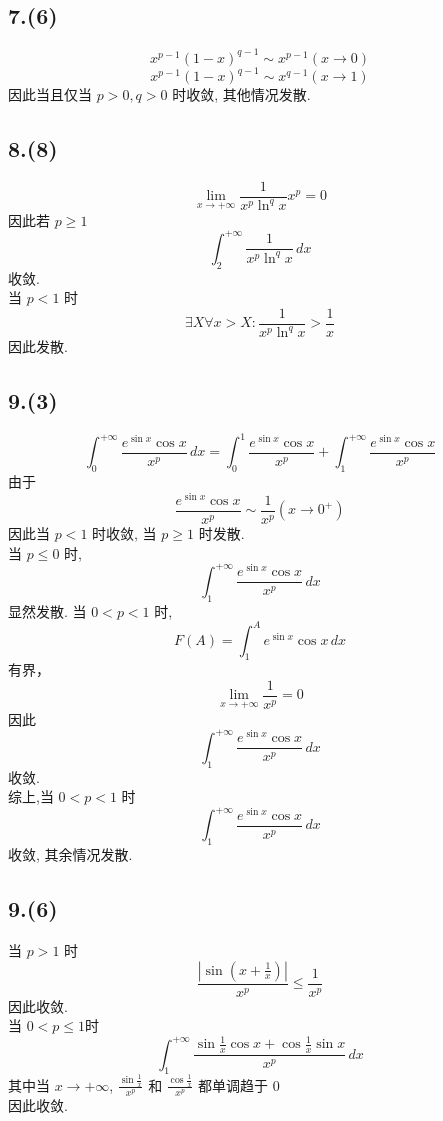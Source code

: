 \documentclass[12pt, a4paper, oneside]{ctexart}
\begin{document}
        \subsection*{7.(6)}
            $$
                x^{p-1}(1-x)^{q-1}\sim x^{p-1} (x\to 0)
            $$
            $$
                x^{p-1}(1-x)^{q-1}\sim x^{q-1} (x\to 1)
            $$
            因此当且仅当 $p>0,q>0$ 时收敛, 其他情况发散.
        \subsection*{8.(8)}
            $$
                \lim_{x\to +\infty}\frac{1}{x^p\ln^qx}x^p=0
            $$
            因此若 $p \geq 1$
            $$
                \int^{+\infty}_{2}\frac{1}{x^p\ln^q x}\,dx
            $$
            收敛.\\
            当 $p < 1$ 时
            $$
                \exists X \forall x > X:\frac{1}{x^p\ln^qx}> \frac1x
            $$
            因此发散.
        \subsection*{9.(3)}
            $$
                \int_{0}^{+\infty}\frac{e^{\sin x}\cos x}{x^p}\,dx=\int_{0}^{1}\frac{e^{\sin x}\cos x}{x^p}+\int_{1}^{+\infty}\frac{e^{\sin x}\cos x}{x^p}
            $$
            由于
            $$
                \frac{e^{\sin x}\cos x}{x^p}\sim \frac{1}{x^p}(x\to 0^+)
            $$
            因此当 $p<1$ 时收敛, 当 $p\geq 1$ 时发散.\\
            当 $p\leq 0$ 时,
            $$
                \int_{1}^{+\infty}\frac{e^{\sin x}\cos x}{x^p}\,dx
            $$
            显然发散.
            当 $0<p<1$ 时,
            $$
                F(A)=\int_{1}^{A}e^{\sin x}\cos x\,dx
            $$
            有界，
            $$
                \lim_{x\to+\infty}\frac{1}{x^p}=0
            $$
            因此 
            $$
                \int_{1}^{+\infty}\frac{e^{\sin x}\cos x}{x^p}\,dx
            $$
            收敛.\\
            综上,当 $0<p<1$ 时
            $$
                \int_{1}^{+\infty}\frac{e^{\sin x}\cos x}{x^p}\,dx
            $$
            收敛, 其余情况发散.
        \subsection*{9.(6)}
            当 $p>1$ 时
            $$
                \frac{|\sin(x+\frac1x)|}{x^p}\leq \frac{1}{x^p}
            $$
            因此收敛.\\
            当 $0<p\leq 1$时
            $$
                \int_{1}^{+\infty}\frac{\sin\frac1x\cos x+\cos\frac1x\sin x}{x^p}\,dx
            $$
            其中当 $x\to+\infty$, $\frac{\sin\frac1x}{x^p}$ 和 $\frac{\cos\frac1x}{x^p}$ 都单调趋于 $0$\\
            因此收敛.
\end{document}
